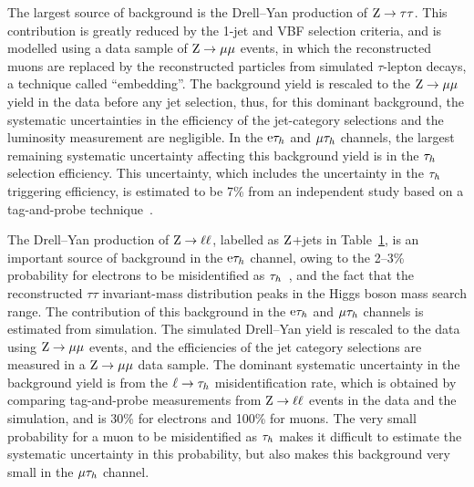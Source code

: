 \documentclass[12pt,twoside,a4paper,cmspaper,final,collab]{cms-tdr}
\begin{document}
\begin{table}[!hp]
\begin{center}
\begin{tabular}{c|c|c|c}
  \hline
\end{tabular}
\label{tab:htt_numevents}
\end{center}
\end{table}

The largest source of background is the Drell--Yan production of $\mathrm{Z}\to\tau\tau$.
This contribution is greatly reduced by the 1-jet and VBF selection criteria,
and is modelled using a data sample of $\mathrm{Z}\to{\mu}{\mu}$ events,
in which the reconstructed muons are replaced by the reconstructed particles from simulated $\tau$-lepton decays,
a technique called ``embedding''.
The background yield is rescaled to the $\mathrm{Z}\to{\mu}{\mu}$ yield in the data before any jet selection, thus,
for this dominant background, the systematic uncertainties in the efficiency of the jet-category selections and  the luminosity measurement are negligible.
In the $\mathrm{e}\tau_h$ and ${\mu}\tau_h$ channels, the largest remaining systematic uncertainty affecting this background yield is in the $\tau_h$ selection efficiency.
This uncertainty, which includes the uncertainty in the $\tau_h$ triggering efficiency, is estimated to be 7\% from an independent study based on a tag-and-probe technique~\cite{CMS:2011aa}.

The Drell--Yan production of $\mathrm{Z}\to \ell\ell$,
labelled as $\mathrm{Z}$+jets in Table~\ref{tab:htt_numevents},
is an important source of background in the $\mathrm{e}\tau_h$ channel,
owing to the 2--3\% probability for electrons to be misidentified as $\tau_h$~\cite{CMS-PAS-TAU-11-001},
and the fact that the reconstructed $\tau\tau$ invariant-mass distribution peaks in the Higgs boson mass search range.
The contribution of this background in the $\mathrm{e}\tau_h$ and $\mu\tau_h$ channels is estimated from simulation.
The simulated Drell--Yan yield is rescaled to the data using $\mathrm{Z}\to{\mu}{\mu}$ events,
and the efficiencies of the jet category selections are measured in a $\mathrm{Z}\to \mu\mu$ data sample.
The dominant systematic uncertainty in the background yield is from the $\ell \to \tau_h$ misidentification rate,
which is obtained by comparing tag-and-probe measurements from $\mathrm{Z}\to \ell\ell$ events in the data and the simulation,
and is 30\% for electrons and 100\% for muons.
The very small probability for a muon to be misidentified as $\tau_h$ makes
it difficult to estimate the systematic uncertainty in this probability, but also makes this background very small in the $\mu\tau_h$ channel.
\end{document}

